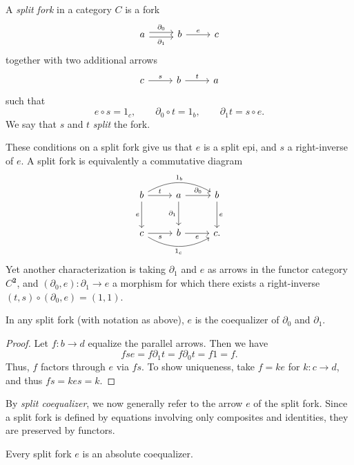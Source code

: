 \begin{definition}\label{dfn:6.4}
	A \emph{split fork} in a category $C$ is a fork
	\[\begin{tikzcd}[row sep = 2.5em, column sep = 2.5em]
	a \ar[" \partial _0 ", shift left, r] \ar[" \partial _1 "', shift right, r]  & b \ar[" e ", r]  & c
	\end{tikzcd}\]
	together with two additional arrows
	\[\begin{tikzcd}[row sep = 2.5em, column sep = 2.5em]
	c \ar[" s ", r]  & b \ar[" t ", r]  & a
	\end{tikzcd}\]
	such that
	\[
		e\circ s=1_c,\qquad \partial _0\circ t=1_b,\qquad \partial _1 t = s\circ e
	.\]
	We say that $s$ and $t$ \emph{split} the fork.
\end{definition}

These conditions on a split fork give us that $e$ is a split epi, and $s$ a right-inverse of $e$. A split fork is equivalently a commutative diagram
\[\begin{tikzcd}[row sep = 2.5em, column sep = 2.5em]
b \ar[" t ", r] \ar[" 1_b ", bend left, rr] \ar[" e "', d]  & a\ar[" \partial _0 ", r] \ar[" \partial _1 "', d]  & b \ar[" e ", d]  \\
c\ar[" s "', r]  \ar[" 1_c "', bend right, rr] & b \ar[" e "', r]  & c.
\end{tikzcd}\]
Yet another characterization is taking $\partial _1$ and $e$ as arrows in the functor category $C^\mathbf{2} $, and $(\partial _0,e): \partial _1 \to e$ a morphism for which there exists a right-inverse $(t,s)\circ (\partial _0,e)=(1,1)$.

\begin{lemma}\label{lma:6.1}
	In any split fork (with notation as above), $e$ is the coequalizer of $\partial _0$ and $\partial _1$.
\end{lemma}
\begin{proof}
	Let $f : b \to d$ equalize the parallel arrows. Then we have
	\[
		fse=f \partial _1t=f \partial _0 t=f1=f
	.\]
	Thus, $f$ factors through $e$ via $fs$. To show uniqueness, take $f=ke$ for $k : c \to d$, and thus $fs=kes=k$.
\end{proof}

By \emph{split coequalizer}, we now generally refer to the arrow $e$ of the split fork. Since a split fork is defined by equations involving only composites and identities, they are preserved by functors.

\begin{corollary}\label{cor:6.1}
	Every split fork $e$ is an absolute coequalizer.
\end{corollary}

